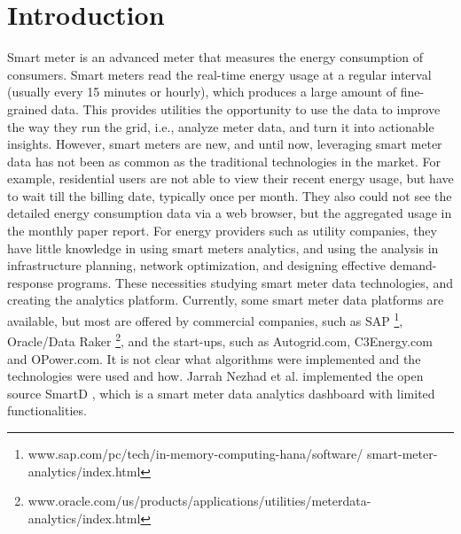 \documentclass{sig-alternate}
\newcommand{\ie}{i.e.}
\newcommand{\et}{et al. }
\begin{document}
\section{Introduction}
Smart meter is an advanced meter that measures the energy consumption of  consumers. Smart meters read the real-time energy usage at a regular interval (usually every 15 minutes or hourly), which  produces a large amount of fine-grained data. This provides utilities the opportunity to use the data to improve the way they run the grid, \ie, analyze meter data, and turn it into actionable insights. However, smart meters are  new, and until now, leveraging smart meter data has not been as common as the traditional  technologies in the market. For example, residential users are not able to view their recent energy usage, but have to wait till the billing date,  typically once per month. They also could not see the detailed energy consumption data via a web browser, but the aggregated usage in the monthly paper report. For energy providers such as utility companies, they have little knowledge in using smart meters analytics, and  using the analysis in infrastructure planning, network optimization, and designing effective demand-response programs.  These necessities studying smart meter data technologies, and creating the analytics platform. Currently, some smart meter data platforms are available, but most are offered by commercial companies, such as SAP \footnote{www.sap.com/pc/tech/in-memory-computing-hana/software/ smart-meter-analytics/index.html}, Oracle/Data Raker \footnote{www.oracle.com/us/products/applications/utilities/meterdata-analytics/index.html}, and the start-ups, such as Autogrid.com, C3Energy.com and OPower.com. It is not clear what algorithms were implemented and the technologies were used and how. Jarrah Nezhad \et implemented the open source SmartD \cite{jarrah}, which  is a smart meter data analytics dashboard with limited functionalities.
\end{document}
